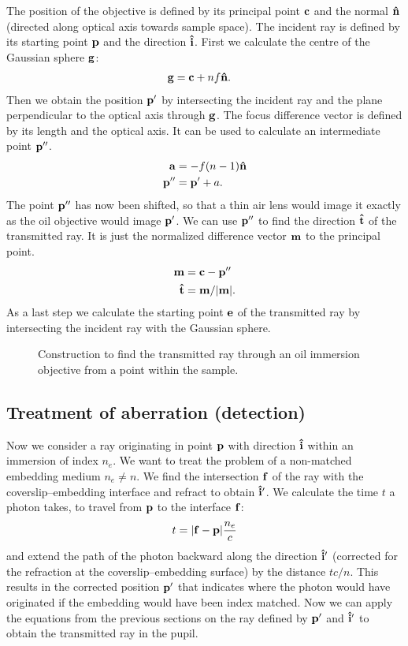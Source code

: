 The position of the objective is defined by its principal point $\mathbf{c}$
and the normal $\mathbf{\hat{n}}$ (directed along optical axis towards sample
space). The incident ray is defined by its starting point $\mathbf{p}$ and the
direction $\mathbf{\hat{i}}$. First we calculate the centre of the Gaussian sphere
$\mathbf{g}$:
\begin{align}
  \mathbf{g} &= \mathbf{c} + nf \mathbf{\hat{n}}.
\end{align}
Then we obtain the position $\mathbf{p}'$ by intersecting the incident ray and
the plane perpendicular to the optical axis through $\mathbf{g}$.  The focus
difference vector is defined by its length and the optical axis. It
can be used to calculate an intermediate point $\mathbf{p}''$.
\begin{align}
  \mathbf{a} &= -f(n-1)\mathbf{\hat{n}} \\
  \mathbf{p}'' &= \mathbf{p}' + a.
\end{align}
The point $\mathbf{p}''$ has now been shifted, so that a thin air lens would
image it exactly as the oil objective would image $\mathbf{p}'$. We can use
$\mathbf{p}''$ to find the direction $\mathbf{\hat{t}}$ of the transmitted ray. It is just
the normalized difference vector $\mathbf{m}$ to the principal point.
\begin{align}
  \mathbf{m} &= \mathbf{c} - \mathbf{p}'' \\
  \mathbf{\hat{t}} &= \mathbf{m} / \mathopen| \mathbf{m} \mathclose|.
\end{align}
As a last step we calculate the starting point $\mathbf{e}$ of the transmitted
ray by intersecting the incident ray with the Gaussian sphere.
\begin{figure}[!hbt]
  \centering
  
  \caption{Construction to find the transmitted ray through an oil
    immersion objective from a point within the sample.}
  \label{fig:obj-ref-full}
\end{figure}
\subsection{Treatment of aberration (detection)}
\label{sec:ray-aberration}
Now we consider a ray originating in point $\mathbf{p}$ with direction $\mathbf{\hat{i}}$
within an immersion of index $n_e$. We want to treat the problem of a
non-matched embedding medium $n_e\not=n$. We find the intersection
$\mathbf{f}$ of the ray with the coverslip--embedding interface and refract to
obtain $\mathbf{\hat{i}}'$. We calculate the time $t$ a photon takes, to travel from
$\mathbf{p}$ to the interface $\mathbf{f}$:
\begin{align}
  t = \mathopen| \mathbf{f} - \mathbf{p} \mathclose| \frac{n_e}{c}
\end{align}
and extend the path of the photon backward along the direction $\mathbf{\hat{i}}'$
(corrected for the refraction at the coverslip--embedding surface) by
the distance $tc/n$. This results in the corrected position $\mathbf{p}'$ that
indicates where the photon would have originated if the embedding
would have been index matched.  Now we can apply the equations from
the previous sections on the ray defined by $\mathbf{p}'$ and $\mathbf{\hat{i}}'$ to obtain
the transmitted ray in the pupil.

